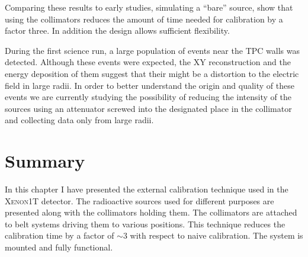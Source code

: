 Comparing these results to early studies, simulating a ``bare'' source, show that using the collimators reduces the amount of time needed for calibration by a factor three. In addition the design allows sufficient flexibility.

During the first science run, a large population of events near the TPC walls was detected. Although these events were expected, the XY reconstruction and the energy deposition of them suggest that their might be a distortion to the electric field in large radii. In order to better understand the origin and quality of these events we are currently studying the possibility of reducing the intensity of the sources using an attenuator screwed into the designated place in the collimator and collecting data only from large radii.  

\section{Summary}

In this chapter I have presented the external calibration technique used in the \textsc{Xenon1T} detector. The radioactive sources used for different purposes are presented along with the collimators holding them. The collimators are attached to belt systems driving them to various positions. This technique reduces the calibration time by a factor of $\sim3$ with respect to naive calibration. The system is mounted and fully functional.   
